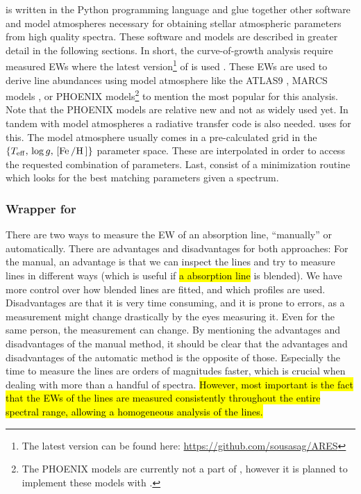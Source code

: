  is written in the Python programming language and glue together other software and
model atmospheres necessary for obtaining stellar atmospheric parameters from high quality spectra.
These software and models are described in greater detail in the following sections. In short, the
curve-of-growth analysis require measured EWs where the latest version\footnote{The latest version
can be found here: \url{https://github.com/sousasag/ARES}} of  is used
\citep{Sousa2015a}. These EWs are used to derive line abundances using model atmosphere like the
ATLAS9 \citep{Kurucz1993}, MARCS models \citep{Gustafson2008}, or PHOENIX models\footnote{The
PHOENIX models are currently not a part of , however it is planned to implement these
models with .} \citep{Husser2013} to mention the most popular for this analysis. Note that the
PHOENIX models are relative new and not as widely used yet. In tandem with model atmospheres a
radiative transfer code is also needed.  uses  \citep{Sneden1973} for this.
The model atmosphere usually comes in a pre-calculated grid in the $\{T_\mathrm{eff},\,\log
g,\,[\ion{Fe}/\ion{H}]\}$ parameter space. These are interpolated in order to access the requested
combination of parameters. Last,  consist of a minimization routine which looks for the
best matching parameters given a spectrum.



\subsubsection{Wrapper for }
\label{sec:measureEW}

There are two ways to measure the EW of an absorption line, ``manually'' or automatically. There are
advantages and disadvantages for both approaches: For the manual, an advantage is that we can
inspect the lines and try to measure lines in different ways (which is useful if \hl{a absorption
line} is blended). We have more control over how blended lines are fitted, and which profiles are
used. Disadvantages are that it is very time consuming, and it is prone to errors, as a measurement
might change drastically by the eyes measuring it. Even for the same person, the measurement can
change. By mentioning the advantages and disadvantages of the manual method, it should be clear that
the advantages and disadvantages of the automatic method is the opposite of those. Especially the
time to measure the lines are orders of magnitudes faster, which is crucial when dealing with more
than a handful of spectra. \hl{However, most important is the fact that the EWs of the lines are
measured consistently throughout the entire spectral range, allowing a homogeneous analysis of the
lines.}


